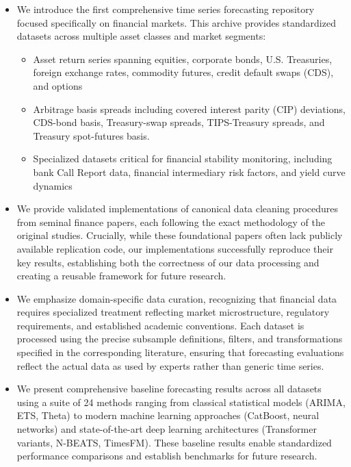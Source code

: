 \documentclass{article}
\begin{document}
\begin{itemize}
    \item We introduce the first comprehensive time series forecasting repository focused specifically on financial markets. This archive provides standardized datasets across multiple asset classes and market segments:
    \begin{itemize}
        \item Asset return series spanning equities, corporate bonds, U.S. Treasuries, foreign exchange rates, commodity futures, credit default swaps (CDS), and options
        \item Arbitrage basis spreads including covered interest parity (CIP) deviations, CDS-bond basis, Treasury-swap spreads, TIPS-Treasury spreads, and Treasury spot-futures basis.
        \item Specialized datasets critical for financial stability monitoring, including bank Call Report data, financial intermediary risk factors, and yield curve dynamics
    \end{itemize}
    
    \item We provide validated implementations of canonical data cleaning procedures from seminal finance papers, each following the exact methodology of the original studies. Crucially, while these foundational papers often lack publicly available replication code, our implementations successfully reproduce their key results, establishing both the correctness of our data processing and creating a reusable framework for future research.
    
    \item We emphasize domain-specific data curation, recognizing that financial data requires specialized treatment reflecting market microstructure, regulatory requirements, and established academic conventions. Each dataset is processed using the precise subsample definitions, filters, and transformations specified in the corresponding literature, ensuring that forecasting evaluations reflect the actual data as used by experts rather than generic time series.
    
    \item We present comprehensive baseline forecasting results across all datasets using a suite of 24 methods ranging from classical statistical models (ARIMA, ETS, Theta) to modern machine learning approaches (CatBoost, neural networks) and state-of-the-art deep learning architectures (Transformer variants, N-BEATS, TimesFM). These baseline results enable standardized performance comparisons and establish benchmarks for future research.
    

\end{itemize}
\end{document}
